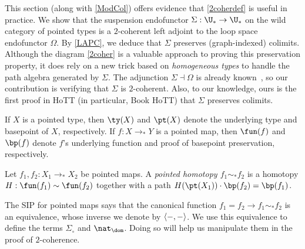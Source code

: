 \documentclass{lmcs}
\theoremstyle{definition}\newtheorem{note}[thm]{Note}
\begin{document}
This section (along with \autoref{ModCol}) offers evidence that \autoref{2coherdef} is useful in practice. We show that the suspension endofunctor $\Sigma : \U_{\ast} \to \U_{\ast}$ on the wild category of pointed types is a $2$-coherent left adjoint to the loop space endofunctor $\Omega$. By \autoref{LAPC}, we deduce that $\Sigma$ preserves (graph-indexed) colimits. Although the diagram \eqref{2coher} is a valuable approach to proving this preservation property, it does rely on a new trick based on \emph{homogeneous types} to handle the path algebra generated by $\Sigma$. The adjunction $\Sigma \dashv \Omega$ is already known~\cite[Lemma 2.16]{Hur}, so our contribution is verifying that $\Sigma$ is $2$-coherent. Also, to our knowledge, ours is the first proof in HoTT (in particular, Book HoTT) that $\Sigma$ preserves colimits.

If $X$ is a pointed type, then $\ty(X)$ and $\pt(X)$ denote the underlying type and basepoint of $X$, respectively. If $f : X \to_{\ast} Y$ is a pointed map, then $\fun(f)$ and $\bp(f)$ denote $f$'s underlying function and proof of basepoint preservation, respectively.
\begin{defi}
Let $f_1, f_2 : X_1 \to_{\ast} X_2$ be pointed maps. A \emph{pointed homotopy $f_1 \sim_{\ast} f_2$} is a homotopy $H : \fun(f_1) \sim \fun(f_2)$ together with a path $ H(\pt(X_1)) \cdot \bp(f_2) = \bp(f_1)$.
\end{defi}
The SIP for pointed maps says that the canonical function $f_1 = f_2 \to f_1 \sim_{\ast} f_2$ is an equivalence, whose  inverse we denote by $\mleft\langle{{-},{-}}\mright\rangle$. We use this equivalence to define the terms $\Sigma_{\circ}$ and $\nat_{\dom}$. Doing so will help us manipulate them in the proof of $2$-coherence. 
\end{document}
